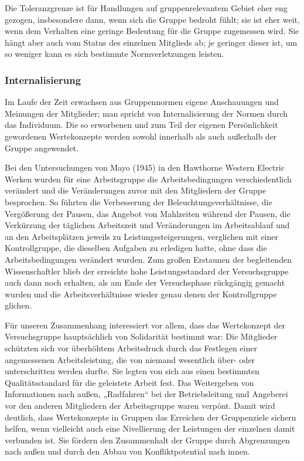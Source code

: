 \documentclass[12pt]{scrartcl}
\begin{document}
Die Toleranzgrenze ist für Handlungen auf gruppenrelevantem Gebiet eher eng
gezogen, insbesondere dann, wenn sich die Gruppe bedroht fühlt; sie ist eher
weit, wenn dem Verhalten eine geringe Bedeutung für die Gruppe zugemessen wird.
Sie hängt aber auch vom Status des einzelnen Mitglieds ab; je geringer dieser
ist, um so weniger kann es sich bestimmte Normverletzungen leisten.

\subsubsection{Internalisierung}
Im Laufe der Zeit erwachsen aus Gruppennormen eigene Anschauungen und Meinungen
der Mitglieder; man spricht von Internalisierung der Normen durch das
Individuum. Die so erworbenen und zum Teil der eigenen Persönlichkeit
gewordenen Wertekonzepte werden sowohl innerhalb als auch außerhalb der Gruppe
angewendet.

Bei den Untersuchungen von Mayo (1945) in den Hawthorne Western Electric Werken
wurden für eine Arbeitsgruppe die Arbeitsbedingungen verschiedentlich verändert
und die Veränderungen zuvor mit den Mitgliedern der Gruppe besprochen. So
führten die Verbesserung der Beleuchtungsverhältnisse, die Vergößerung der
Pausen, das Angebot von Mahlzeiten während der Pausen, die Verkürzung der
täglichen Arbeitszeit und Veränderungen im Arbeitsablauf und an den
Arbeitsplätzen jeweils zu Leistungssteigerungen, verglichen mit einer
Kontrollgruppe, die dieselben Aufgaben zu erledigen hatte, ohne dass die
Arbeitsbedingungen verändert wurden. Zum großen Erstaunen der begleitenden
Wissenschaftler blieb der erreichte hohe Leistungsstandard der Versuchsgruppe
auch dann noch erhalten, als am Ende der Versuchsphase rückgängig gemacht
wurden und die Arbeitsverhältnisse wieder genau denen der Kontrollgruppe
glichen.

Für unseren Zusammenhang interessiert vor allem, dass das Wertekonzept der
Versuchsgruppe hauptsächlich von Solidarität bestimmt war: Die Mitglieder
schützten sich vor überhöhtem Arbeitsdruck durch das Festlegen einer
angemessenen Arbeitsleistung, die von niemand wesentlich über- oder
unterschritten werden durfte. Sie legten von sich aus einen bestimmten
Qualitätsstandard für die geleistete Arbeit fest. Das Weitergeben von
Informationen nach außen, „Radfahren“ bei der Betriebsleitung und Angeberei vor
den anderen Mitgliedern der Arbeitsgruppe waren verpönt. Damit wird deutlich,
dass Wertekonzepte in Gruppen das Erreichen der Gruppenziele sichern helfen,
wenn vielleicht auch eine Nivellierung der Leistungen der einzelnen damit
verbunden ist. Sie fördern den Zusammenhalt der Gruppe durch Abgrenzungen nach
außen und durch den Abbau von Konfliktpotential nach innen.
\end{document}
